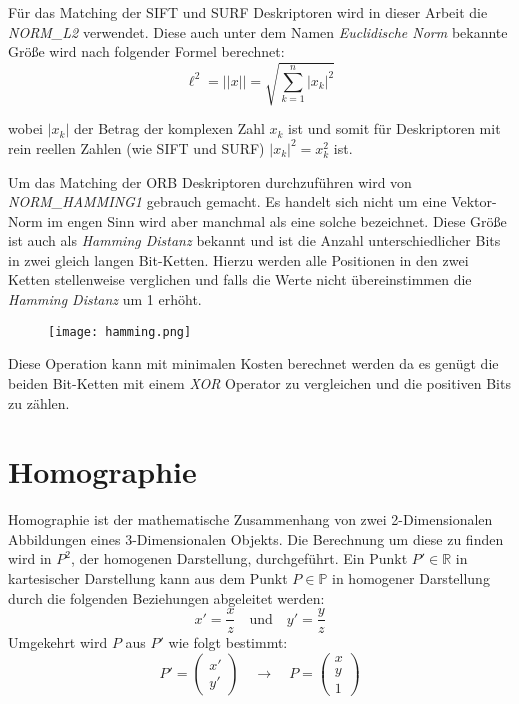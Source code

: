 Für das Matching der SIFT und SURF Deskriptoren wird in dieser Arbeit die \emph{NORM\_L2} verwendet.
Diese auch unter dem Namen \emph{Euclidische Norm} bekannte Größe wird nach folgender Formel berechnet:
\begin{equation}
\ell^2 = ||x|| = \sqrt{\sum_{k=1}^{n}|x_k|^2}
\end{equation}

wobei $|x_k|$ der Betrag der komplexen Zahl $x_k$ ist und somit für Deskriptoren mit rein reellen Zahlen (wie SIFT und SURF) $|x_k|^2 = x_k^2$ ist.

Um das Matching der ORB Deskriptoren durchzuführen wird von \emph{NORM\_HAMMING1} gebrauch gemacht.
Es handelt sich nicht um eine Vektor-Norm im engen Sinn wird aber manchmal als eine solche bezeichnet.
Diese Größe ist auch als \emph{Hamming Distanz} bekannt und ist die Anzahl unterschiedlicher Bits in zwei gleich langen Bit-Ketten.
Hierzu werden alle Positionen in den zwei Ketten stellenweise verglichen und falls die Werte nicht übereinstimmen die \emph{Hamming Distanz} um 1 erhöht. 

\begin{figure}[h]
\texttt{[image: hamming.png]}
\centering
\end{figure}

Diese Operation kann mit minimalen Kosten berechnet werden da es genügt die beiden Bit-Ketten mit einem \emph{XOR} Operator zu vergleichen und die positiven Bits zu zählen. \cite{cvman}

\section{Homographie}
Homographie ist der mathematische Zusammenhang von zwei 2-Dimensionalen Abbildungen eines 3-Dimensionalen Objekts.
Die Berechnung um diese zu finden wird in $P^2$, der homogenen Darstellung, durchgeführt.
Ein Punkt $P'\in \mathbb{R}$ in kartesischer Darstellung kann aus dem Punkt $P \in \mathbb{P}$ in homogener Darstellung durch die folgenden Beziehungen abgeleitet werden:
\begin{equation}
x' = \dfrac{x}{z} \quad \text{und} \quad y' = \dfrac{y}{z}
\end{equation}
Umgekehrt wird $P$ aus $P'$ wie folgt bestimmt:
\begin{equation}
P' = 
\begin{pmatrix}
    x'\\
    y'
\end{pmatrix}
\quad \rightarrow \quad
P = 
\begin{pmatrix}
    x\\
    y\\
    1
\end{pmatrix}
\end{equation}

